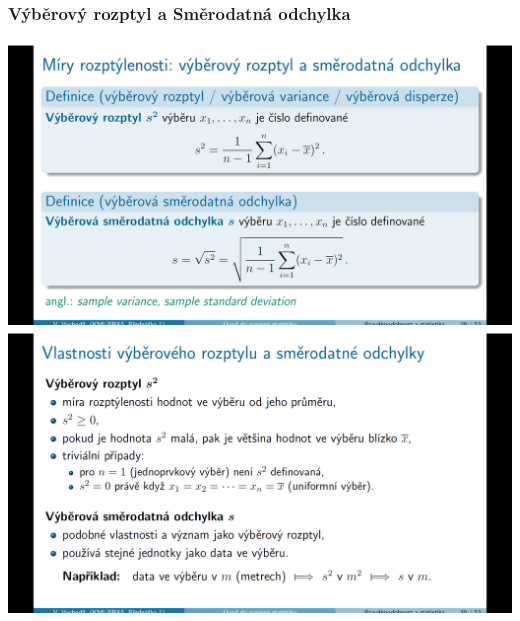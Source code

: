 \documentclass[12pt,a4paper]{article}
\begin{document}
\subsubsection{Výběrový rozptyl a Směrodatná odchylka}
\begin{center}
	\includegraphics[scale=0.32]{img/rozptyl_odchylka}
	\includegraphics[scale=0.32]{img/rozptyl_odchylka_properties}
\end{center}
\newpage
\end{document}
